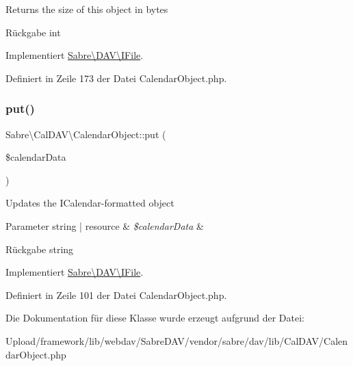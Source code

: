 Returns the size of this object in bytes

\begin{DoxyReturn}{Rückgabe}
int 
\end{DoxyReturn}


Implementiert \mbox{\hyperlink{interface_sabre_1_1_d_a_v_1_1_i_file_aa1534e00805f45d9282de9c699dbe178}{Sabre\textbackslash{}\+D\+A\+V\textbackslash{}\+I\+File}}.



Definiert in Zeile 173 der Datei Calendar\+Object.\+php.

\mbox{\label{class_sabre_1_1_cal_d_a_v_1_1_calendar_object_a54849fa5cf3916e8f108485f5ffb0851}} 
\subsubsection{\texorpdfstring{put()}{put()}}
{\footnotesize\ttfamily Sabre\textbackslash{}\+Cal\+D\+A\+V\textbackslash{}\+Calendar\+Object\+::put (\begin{DoxyParamCaption}\item[{}]{\$calendar\+Data }\end{DoxyParamCaption})}

Updates the I\+Calendar-\/formatted object


\begin{DoxyParams}[1]{Parameter}
string | resource & {\em \$calendar\+Data} & \\
\hline
\end{DoxyParams}
\begin{DoxyReturn}{Rückgabe}
string 
\end{DoxyReturn}


Implementiert \mbox{\hyperlink{interface_sabre_1_1_d_a_v_1_1_i_file_a0c30bc87b22d289f311c854f23993452}{Sabre\textbackslash{}\+D\+A\+V\textbackslash{}\+I\+File}}.



Definiert in Zeile 101 der Datei Calendar\+Object.\+php.



Die Dokumentation für diese Klasse wurde erzeugt aufgrund der Datei\+:\begin{DoxyCompactItemize}
\item 
Upload/framework/lib/webdav/\+Sabre\+D\+A\+V/vendor/sabre/dav/lib/\+Cal\+D\+A\+V/Calendar\+Object.\+php\end{DoxyCompactItemize}
